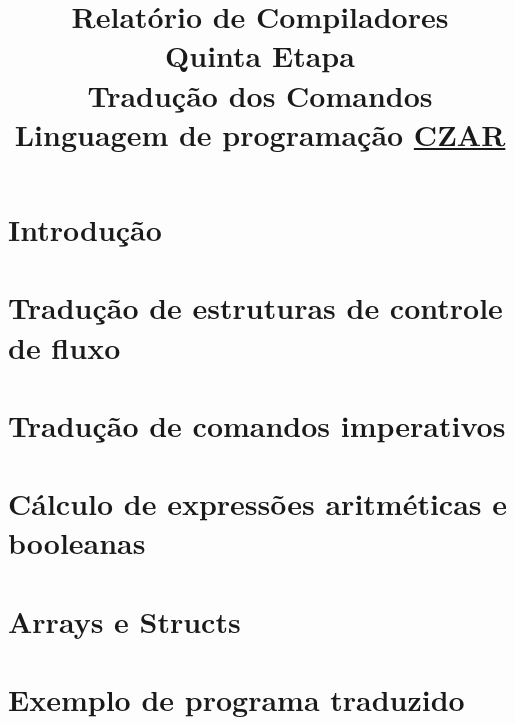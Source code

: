 \documentclass[12pt,oneside,a4paper,english]{abntex2}
\title{Relatório de Compiladores\\Quinta Etapa\\Tradução dos Comandos\\Linguagem de programação \underline{CZAR}}
\begin{document}
\frenchspacing %

\imprimirfolhaderosto

\tableofcontents

\textual

\chapter{Introdução}
\label{chap:introducao}
	

\chapter{Tradução de estruturas de controle de fluxo}
\label{chap:traducao-estruturas-controle}
	

\chapter{Tradução de comandos imperativos}
\label{chap:traducao-comandos-imperativos}
	
	
\chapter{Cálculo de expressões aritméticas e booleanas}
\label{chap:calculo-expressoes}
	

\chapter{Arrays e Structs}
\label{chap:array}
	

\chapter{Exemplo de programa traduzido}
\label{chap:caracteristicas-gerais}
	

\postextual


\end{document}
